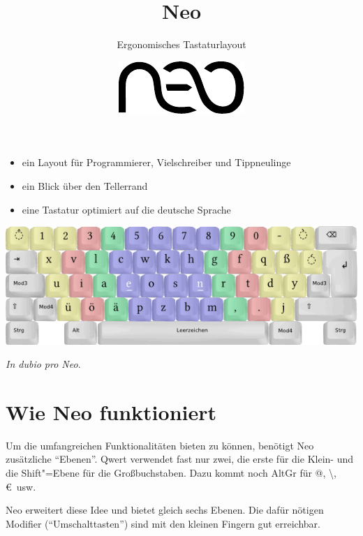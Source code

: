 \documentclass[%
  a4paper
  ,ngerman
  ,notumble,12pt,
]{leaflet}
\title{Neo}
\author{Ergonomisches Tastaturlayout}
\date{\includegraphics[height=3ex]{neo_logo}}
\begin{document}
\maketitle
\thispagestyle{empty}
\begin{itemize}%
\item ein Layout für Programmierer, Vielschreiber und Tippneulinge
\item ein Blick über den Tellerrand
\item eine Tastatur optimiert auf die deutsche Sprache
\end{itemize}%

\vfill

\includegraphics[width=\textwidth]{tastatur_neo_Ebene1}

\vfill

\begin{center}
\emph{In dubio pro Neo}.
\end{center}
\newpage
\section{Wie Neo funktioniert}
Um die umfangreichen Funktionalitäten bieten zu können, benötigt Neo zusätzliche \enquote{Ebenen}. Qwert verwendet fast nur zwei, die erste für die Klein- und die Shift"=Ebene für die Großbuchstaben. Dazu kommt noch AltGr für @, \textbackslash, \euro\ usw.

Neo erweitert diese Idee und bietet gleich sechs Ebenen. Die dafür nötigen Modifier (\enquote{Umschalttasten}) sind mit den kleinen Fingern gut erreichbar.
\end{document}
